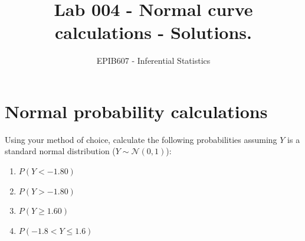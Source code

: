 \documentclass[letterpaper,12pt,twoside,]{pinp}
\title{Lab 004 - Normal curve calculations - Solutions.}
\author[a]{EPIB607 - Inferential Statistics}
\affil[a]{Fall 2020, McGill University}
\providecommand{\tightlist}{%
  \setlength{\itemsep}{0pt}\setlength{\parskip}{0pt}}
\begin{document}
\verticaladjustment{-2pt}

\maketitle
\thispagestyle{firststyle}



\hypertarget{normal-probability-calculations}{%
\section{Normal probability
calculations}\label{normal-probability-calculations}}

Using your method of choice, calculate the following probabilities
assuming \(Y\) is a standard normal distribution
(\(Y \sim \mathcal{N}(0,1)\)):

\begin{enumerate}
\def\labelenumi{\alph{enumi})}
\tightlist
\item
  \(P(Y < -1.80)\)
\item
  \(P(Y > -1.80)\)
\item
  \(P(Y \geq 1.60)\)
\item
  \(P(-1.8 < Y \leq 1.6)\)
\end{enumerate}

\begin{Shaded}
\begin{Highlighting}[]
\OperatorTok{::}\NormalTok{(} \NormalTok{)}
\end{Highlighting}
\end{Shaded}
\end{document}
